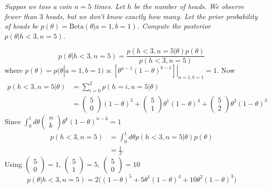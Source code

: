\begin{example}
	\emph{Suppos we toss a coin $n=5$ times. Let $h$ be the number of heads. We observe fewer than $3$ heads, but we don't know exactly how many. Let the prior probability of heads be $p(\theta)=\text{Beta}(\theta|a=1,b=1)$. Compute the posterior $p(\theta|h<3, n=5)$.}
	
	\begin{equation}
		p(\theta|h<3,n=5) = \frac{p(h<3,n=5|\theta)p(\theta)}{p(h<3,n=5)}
	\end{equation}
	where $p(\theta)=p(\theta|a=1,b=1)\propto [\theta^{a-1}(1-\theta)^{b-1}]|_{a=1,b=1}=1$. Now
	\begin{equation}
		\begin{split}
			p(h<3,n=5|\theta) & =\sum_{i=0}^2p(h=i,n=5|\theta)\\
			&= \begin{pmatrix}
				5 \\ 0 
			\end{pmatrix}(1-\theta)^5+\begin{pmatrix}
				5 \\ 1 
			\end{pmatrix}\theta ^1(1-\theta)^4+\begin{pmatrix}
				5 \\ 2 
			\end{pmatrix}\theta ^2(1-\theta)^3
		\end{split}
	\end{equation}
	Since $\int_0^1d\theta \begin{pmatrix}
		n \\ k 
	\end{pmatrix}\theta^k(1-\theta)^{n-k} = 1$
	\begin{equation}
		\begin{split}
			p(h<3,n=5) &= \int_0^1d\theta p(h<3,n=5|\theta)p(\theta)\\
			&= \frac{1}{2}.
		\end{split}
	\end{equation}
	Using $\begin{pmatrix}
		5 \\ 0 
	\end{pmatrix}=1$, $\begin{pmatrix}
		5 \\ 1 
	\end{pmatrix} = 5$, $\begin{pmatrix}
		5 \\ 0 
	\end{pmatrix} = 10$
	\begin{equation}
		p(\theta|h<3,n=5) = 2\bigg((1-\theta)^5+5\theta ^1(1-\theta)^4+10\theta ^2(1-\theta)^3\bigg)
	\end{equation} 
\end{example}


